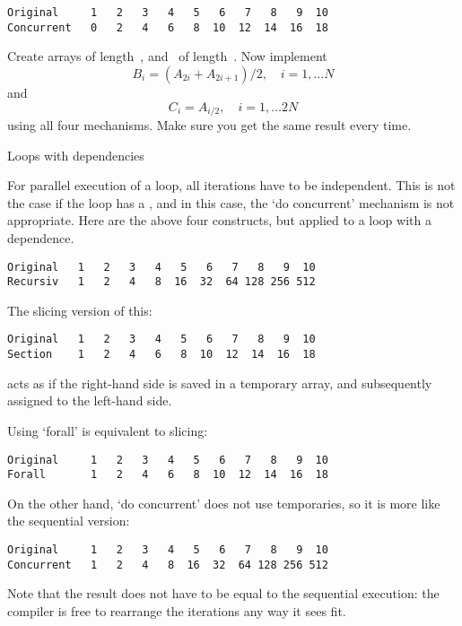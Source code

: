 \begin{verbatim}
Original     1   2   3   4   5   6   7   8   9  10
Concurrent   0   2   4   6   8  10  12  14  16  18
\end{verbatim}

\begin{exercise}
  Create arrays  of length~, and ~of length~.
  Now implement
  \[ B_i = (A_{2i}+A_{2i+1})/2,\quad i=1,\ldots N \]
  and
  \[ C_i = A_{i/2},\quad i=1,\ldots 2N \]
  using all four mechanisms. Make sure you get the same result every time.
\end{exercise}

 {Loops with dependencies}

For parallel execution of a loop, all iterations have to be independent.
This is not the case if the loop has a , and in
this case, the `do concurrent' mechanism is not appropriate.
%
Here are the above four constructs, but applied to a loop with a dependence.
%
%
\begin{verbatim}
Original   1   2   3   4   5   6   7   8   9  10
Recursiv   1   2   4   8  16  32  64 128 256 512
\end{verbatim}

The slicing version of this:
%
%
\begin{verbatim}
Original   1   2   3   4   5   6   7   8   9  10
Section    1   2   4   6   8  10  12  14  16  18
\end{verbatim}
%
acts as if the right-hand side is saved in a temporary array, and
subsequently assigned to the left-hand side.

Using `forall' is equivalent to slicing:
%
%
\begin{verbatim}
Original     1   2   3   4   5   6   7   8   9  10
Forall       1   2   4   6   8  10  12  14  16  18
\end{verbatim}

On the other hand, `do concurrent' does not use temporaries, so it is
more like the sequential version:
%
%
\begin{verbatim}
Original     1   2   3   4   5   6   7   8   9  10
Concurrent   1   2   4   8  16  32  64 128 256 512
\end{verbatim}
Note that the result does not have to be equal to the sequential
execution: the compiler is free to rearrange the iterations any way it
sees fit.

